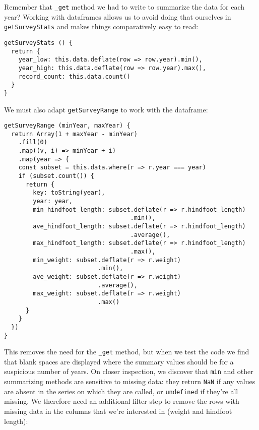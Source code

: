 Remember that \texttt{\_get} method we had to write to summarize the data for each year?
Working with dataframes allows us to avoid doing that ourselves in \texttt{getSurveyStats}
and makes things comparatively easy to read:

\begin{verbatim}
getSurveyStats () {
  return {
    year_low: this.data.deflate(row => row.year).min(),
    year_high: this.data.deflate(row => row.year).max(),
    record_count: this.data.count()
  }
}
\end{verbatim}

We must also adapt \texttt{getSurveyRange} to work with the dataframe:

\begin{verbatim}
getSurveyRange (minYear, maxYear) {
  return Array(1 + maxYear - minYear)
    .fill(0)
    .map((v, i) => minYear + i)
    .map(year => {
    const subset = this.data.where(r => r.year === year)
    if (subset.count()) {
      return {
        key: toString(year),
        year: year,
        min_hindfoot_length: subset.deflate(r => r.hindfoot_length)
                                   .min(),
        ave_hindfoot_length: subset.deflate(r => r.hindfoot_length)
                                   .average(),
        max_hindfoot_length: subset.deflate(r => r.hindfoot_length)
                                   .max(),
        min_weight: subset.deflate(r => r.weight)
                          .min(),
        ave_weight: subset.deflate(r => r.weight)
                          .average(),
        max_weight: subset.deflate(r => r.weight)
                          .max()
      }
    }
  })
}
\end{verbatim}

This removes the need for the \texttt{\_get} method,
but when we test the code we find that blank spaces are displayed
where the summary values should be for a suspicious number of years.
On closer inspection,
we discover that \texttt{min} and other summarizing methods
are sensitive to missing data:
they return \texttt{NaN} if any values are absent in the series on which they are called,
or \texttt{undefined} if they're all missing.
We therefore need an additional filter step
to remove the rows with missing data in the columns
that we're interested in (weight and hindfoot length):

